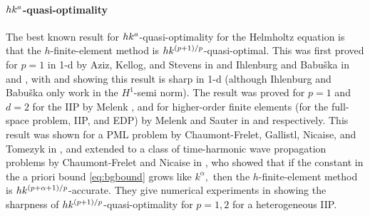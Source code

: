 

\paragraph{$hk^{a}$-quasi-optimality} The best known result for $hk^{a}$-quasi-optimality for the Helmholtz equation is that the $h$-finite-element method is $hk^{(p+1)/p}$-quasi-optimal. This was first proved for $p=1$ in 1-d by Aziz, Kellog, and Stevens in \cite[Theorem 3.1]{AzKeSt:88} and Ihlenburg and Babu\v{s}ka in \cite[Theorem 3]{IhBa:95a} and \cite[Theorems 4.9 and 4.13]{Ih:98}, with \cite[Figures 7-9]{IhBa:95a} and \cite[Section 4.5.4 and Figures 4.11-4.12]{Ih:98} showing this result is sharp in 1-d (although Ihlenburg and Babu\v{s}ka only work in the $H^1$-semi norm). The result was proved for $p=1$ and $d=2$ for the IIP by Melenk \cite[Proposition 8.2.7]{Me:95}, and for higher-order finite elements (for the full-space problem, IIP, and EDP) by Melenk and Sauter in \cite[Corollary 5.6]{MeSa:10} and \cite[Theorem 5.8]{MeSa:11} respectively. This result was shown for a PML problem by Chaumont-Frelet, Gallistl, Nicaise, and Tomezyk in \cite[Theorem 5.1]{ChGaNiTo:18}, and extended to a class of time-harmonic wave propagation problems by Chaumont-Frelet and Nicaise in \cite[Theorem 2.15]{ChNi:19}, who showed that if the constant in the a priori bound \cref{eq:bgbound} grows like $k^\alpha,$ then the $h$-finite-element method is $hk^{(p+\alpha+1)/p}$-accurate. They give numerical experiments in \cite[Figure 8]{ChNi:19} showing the sharpness of $hk^{(p+1)/p}$-quasi-optimality for $p=1, 2$ for a heterogeneous IIP.

